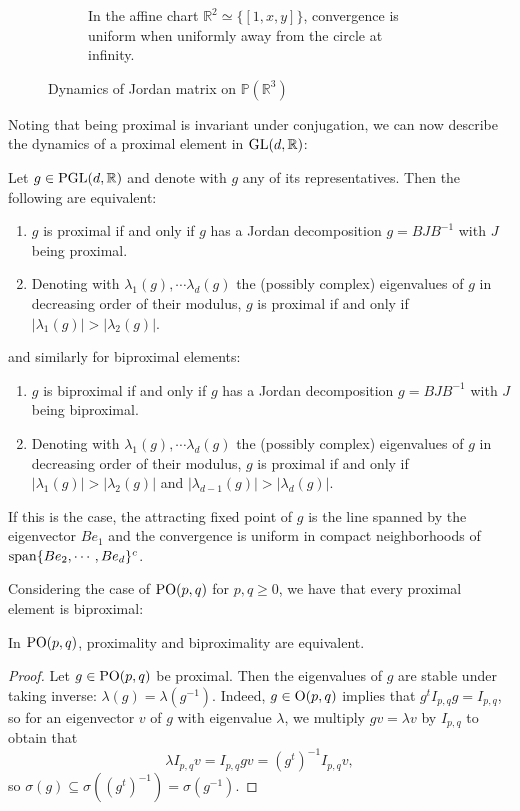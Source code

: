\documentclass{report}
\begin{document}
\begin{figure}[ht]
\begin{subfigure}[b]{0.45\textwidth}
        \caption{In the affine chart $\mathbb R^2 \simeq \{ [1, x, y] \}$, convergence is uniform when uniformly away from the circle at infinity.}
        \label{fig:jordan_dynamics_affine_chart}
    \end{subfigure}
    \caption{Dynamics of Jordan matrix on $\mathbb P(\mathbb R^3)$}
    \label{fig:jordan_matrix_dynamics}
\end{figure}
Noting that being proximal is invariant under conjugation, we can now describe the dynamics of a proximal element in $\operatorname{{\mathrm{GL}}}(d, \mathbb R)$:
\begin{corollary}
    Let $g \in \operatorname{{\mathrm{PGL}}}(d, \mathbb R)$ and denote with $g$ any of its representatives.
    Then the following are equivalent:
    \begin{enumerate}[label=(\roman*)]
        \item $g$ is proximal if and only if $g$ has a Jordan decomposition $g = B J B^{-1}$ with $J$ being proximal.
        \item Denoting with $\lambda_1(g), \cdots \lambda_d(g)$ the (possibly complex) eigenvalues of $g$ in decreasing order of their modulus, $g$ is proximal if and only if $|\lambda_1(g)| > |\lambda_2(g)|$.
    \end{enumerate}
    and similarly for biproximal elements:
    \begin{enumerate}[label=(\roman*)]
        \item $g$ is biproximal if and only if $g$ has a Jordan decomposition $g = B J B^{-1}$ with $J$ being biproximal.
        \item Denoting with $\lambda_1(g), \cdots \lambda_d(g)$ the (possibly complex) eigenvalues of $g$ in decreasing order of their modulus, $g$ is proximal if and only if $|\lambda_1(g)| > |\lambda_2(g)|$ and $|\lambda_{d-1}(g)| > |\lambda_d(g)|$.
    \end{enumerate}
    If this is the case, the attracting fixed point of $g$ is the line spanned by the eigenvector $Be_1$ and the convergence is uniform in compact neighborhoods of $\operatorname{span} \{Be_2, \cdots, Be_d \}^c$.
\end{corollary}

Considering the case of $\operatorname{{\mathrm{PO}}}(p, q)$ for $p, q \geq 0$, we have that every proximal element is biproximal:
\begin{proposition}
    In $\operatorname{{\mathrm{PO}}}(p, q)$, proximality and biproximality are equivalent.
\end{proposition}
\begin{proof}
    Let $g \in \operatorname{{\mathrm{PO}}}(p, q)$ be proximal.
    Then the eigenvalues of $g$ are stable under taking inverse: $\lambda(g) = \lambda(g^{-1})$.
    Indeed, $g \in \operatorname{{\mathrm{O}}}(p,q)$ implies that $g^t I_{p,q} g = I_{p,q}$, so for an eigenvector $v$ of $g$ with eigenvalue $\lambda$, we multiply $gv = \lambda v$ by $I_{p,q}$ to obtain that 
    \[
    \lambda I_{p,q} v =I_{p,q} g v = (g^t)^{-1} I_{p,q} v,
    \]
    so $\sigma(g) \subseteq \sigma((g^t)^{-1}) = \sigma(g^{-1})$.
\end{proof}
\end{document}
